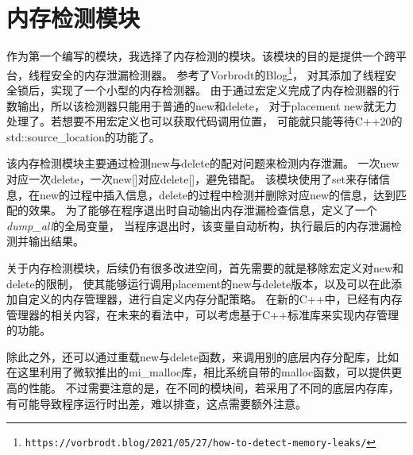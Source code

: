 \section{内存检测模块}

作为第一个编写的模块，我选择了内存检测的模块。该模块的目的是提供一个跨平台，线程安全的内存泄漏检测器。
参考了Vorbrodt的Blog\footnote{\nolinkurl{https://vorbrodt.blog/2021/05/27/how-to-detect-memory-leaks/}}，
对其添加了线程安全锁后，实现了一个小型的内存检测器。
由于通过宏定义完成了内存检测器的行数输出，所以该检测器只能用于普通的new和delete，
对于placement new就无力处理了。若想要不用宏定义也可以获取代码调用位置，
可能就只能等待C++20的std::source\_location的功能了。

该内存检测模块主要通过检测new与delete的配对问题来检测内存泄漏。
一次new对应一次delete，一次new[]对应delete[]，避免错配。
该模块使用了set来存储信息，在new的过程中插入信息，delete的过程中检测并删除对应new的信息，达到匹配的效果。
为了能够在程序退出时自动输出内存泄漏检查信息，定义了一个{\itshape dump\_all}的全局变量，
当程序退出时，该变量自动析构，执行最后的内存泄漏检测并输出结果。





关于内存检测模块，后续仍有很多改进空间，首先需要的就是移除宏定义对new和delete的限制，
使其能够运行调用placement的new与delete版本，以及可以在此添加自定义的内存管理器，进行自定义内存分配策略。
在新的C++中，已经有内存管理器的相关内容，在未来的看法中，可以考虑基于C++标准库来实现内存管理的功能。

除此之外，还可以通过重载new与delete函数，来调用别的底层内存分配库，比如在这里利用了微软推出的mi\_malloc库，相比系统自带的malloc函数，可以提供更高的性能。
不过需要注意的是，在不同的模块间，若采用了不同的底层内存库，有可能导致程序运行时出差，难以排查，这点需要额外注意。






